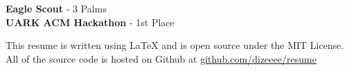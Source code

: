 \documentclass[9pt]{developercv} %
\begin{document}



	
\begin{minipage}[t]{0.3\textwidth}
	\vspace{-\baselineskip} %
	
	
	\textbf{Eagle Scout} - 3 Palms\\
	\textbf{UARK ACM Hackathon} - 1st Place\\
\end{minipage}
\hfill
\begin{minipage}[t]{0.65\textwidth}
	\vspace{-\baselineskip} %
	
	
	This resume is written using LaTeX and is open source under the MIT License. All of the source code is hosted on Github at \href{https://www.github.com/Dizeeee/resume}{github.com/dizeeee/resume}
\end{minipage}
\end{document}
